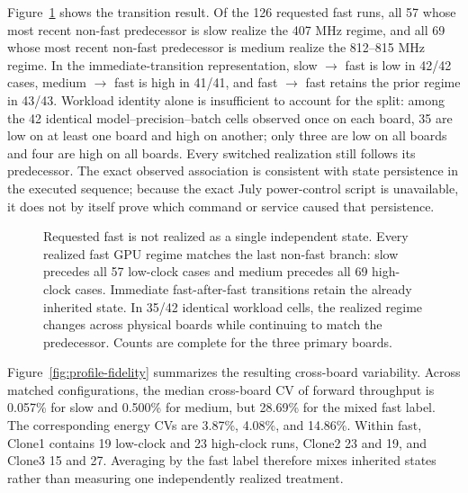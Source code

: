 \documentclass[electronics,article,submit,pdftex,moreauthors]{Definitions/mdpi}
\providecommand{\figref}[1]{Figure~\ref{#1}}
\begin{document}
\figref{fig:state-carryover} shows the transition result. Of the 126 requested fast runs, all 57 whose most recent non-fast predecessor is slow realize the 407 MHz regime, and all 69 whose most recent non-fast predecessor is medium realize the 812--815 MHz regime. In the immediate-transition representation, slow $\rightarrow$ fast is low in 42/42 cases, medium $\rightarrow$ fast is high in 41/41, and fast $\rightarrow$ fast retains the prior regime in 43/43. Workload identity alone is insufficient to account for the split: among the 42 identical model--precision--batch cells observed once on each board, 35 are low on at least one board and high on another; only three are low on all boards and four are high on all boards. Every switched realization still follows its predecessor. The exact observed association is consistent with state persistence in the executed sequence; because the exact July power-control script is unavailable, it does not by itself prove which command or service caused that persistence.

\begin{figure}[t]
\centering
\resizebox{\linewidth}{!}{}
\caption{Requested fast is not realized as a single independent state. Every realized fast GPU regime matches the last non-fast branch: slow precedes all 57 low-clock cases and medium precedes all 69 high-clock cases. Immediate fast-after-fast transitions retain the already inherited state. In 35/42 identical workload cells, the realized regime changes across physical boards while continuing to match the predecessor. Counts are complete for the three primary boards.}
\label{fig:state-carryover}
\end{figure}

\figref{fig:profile-fidelity} summarizes the resulting cross-board variability. Across matched configurations, the median cross-board CV of forward throughput is 0.057\% for slow and 0.500\% for medium, but 28.69\% for the mixed fast label. The corresponding energy CVs are 3.87\%, 4.08\%, and 14.86\%. Within fast, Clone1 contains 19 low-clock and 23 high-clock runs, Clone2 23 and 19, and Clone3 15 and 27. Averaging by the fast label therefore mixes inherited states rather than measuring one independently realized treatment.
\end{document}
